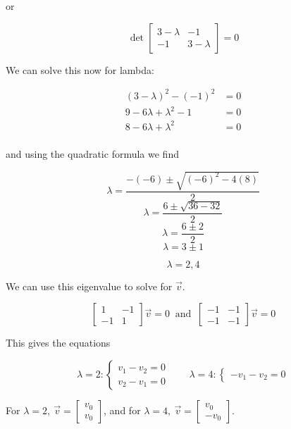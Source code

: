 \documentclass{article}
\begin{document}
or 

$$ \det\begin{bmatrix}
3-\lambda	&	-1	\\
-1	&	3-\lambda	\end{bmatrix} = 0 $$

We can solve this now for lambda:


\begin{align*}
(3-\lambda)^2 - (-1)^2 &= 0 \\
9 - 6\lambda + \lambda^2 - 1 &= 0 \\
8 - 6\lambda + \lambda^2 &= 0 \\
\end{align*}

and using the quadratic formula we find

$$ \lambda = \frac{-(-6) \pm \sqrt{(-6)^2 - 4(8)}}{2} $$
$$ \lambda = \frac{6 \pm \sqrt{36 - 32}}{2} $$
$$ \lambda = \frac{6 \pm 2}{2} $$
$$ \lambda = 3 \pm 1$$

$$\boxed{ \lambda = 2, 4 }$$

We can use this eigenvalue to solve for $\vec{v}$. 

$$\begin{bmatrix}
1 	&	-1	\\
-1	&	1	\end{bmatrix}\vec{v} = 0 \ \text{ and } \ 
\begin{bmatrix}
-1 	&	-1	\\
-1	&	-1	\end{bmatrix}\vec{v} = 0 $$ 

This gives the equations

$$ \lambda = 2: \begin{cases} v_1 - v_2 = 0 \\
                              v_2 - v_1 = 0 \end{cases}
\qquad \lambda = 4: \begin{cases}  -v_1 - v_2 = 0 \end{cases} $$

For $\boxed{ \lambda = 2, \ \vec{v} = \begin{bmatrix}v_0 \\ v_0\end{bmatrix} }$, and for $\boxed{ \lambda = 4, \ \vec{v} = \begin{bmatrix}v_0 \\ -v_0\end{bmatrix} }$.



\end{document}
